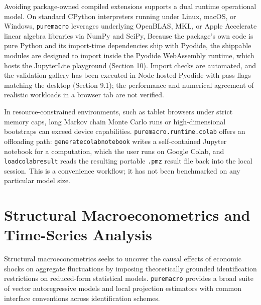 \documentclass[11pt,letterpaper]{article}
\renewcommand{\_}{\pmunderscore\allowbreak}
\begin{document}
Avoiding package-owned compiled extensions supports a dual runtime operational model. On standard CPython interpreters running under Linux, macOS, or Windows, \texttt{puremacro} leverages underlying OpenBLAS, MKL, or Apple Accelerate linear algebra libraries via NumPy and SciPy, Because the package's own code is pure Python and its import-time dependencies ship with Pyodide, the shippable modules are designed to import inside the Pyodide WebAssembly runtime, which hosts the JupyterLite playground (Section 10). Import checks are automated, and the validation gallery has been executed in Node-hosted Pyodide with pass flags matching the desktop (Section 9.1); the performance and numerical agreement of realistic workloads in a browser tab are not verified.

In resource-constrained environments, such as tablet browsers under strict memory caps, long Markov chain Monte Carlo runs or high-dimensional bootstraps can exceed device capabilities. \texttt{puremacro.runtime.colab} offers an offloading path: \texttt{generate\_colab\_notebook} writes a self-contained Jupyter notebook for a computation, which the user runs on Google Colab, and \texttt{load\_colab\_result} reads the resulting portable \texttt{.pmz} result file back into the local session. This is a convenience workflow; it has not been benchmarked on any particular model size.

\section{Structural Macroeconometrics and Time-Series Analysis}\label{structural-macroeconometrics-and-time-series-analysis}

Structural macroeconometrics seeks to uncover the causal effects of economic shocks on aggregate fluctuations by imposing theoretically grounded identification restrictions on reduced-form statistical models. \texttt{puremacro} provides a broad suite of vector autoregressive models and local projection estimators with common interface conventions across identification schemes.
\end{document}
